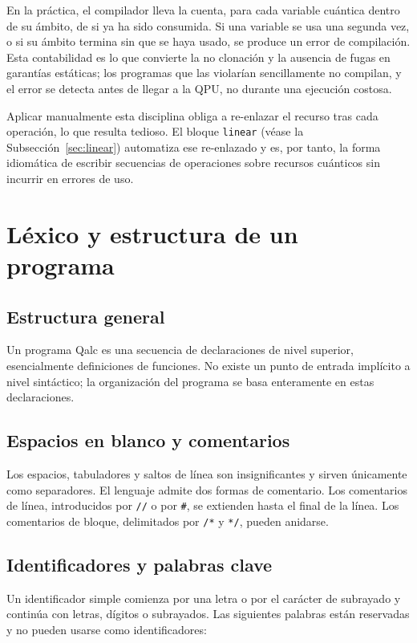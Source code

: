En la práctica, el compilador lleva la cuenta, para cada variable cuántica dentro de su ámbito, de si ya ha sido consumida. Si una variable se usa una segunda vez, o si su ámbito termina sin que se haya usado, se produce un error de compilación. Esta contabilidad es lo que convierte la no clonación y la ausencia de fugas en garantías estáticas; los programas que las violarían sencillamente no compilan, y el error se detecta antes de llegar a la QPU, no durante una ejecución costosa.

Aplicar manualmente esta disciplina obliga a re-enlazar el recurso tras cada operación, lo que resulta tedioso. El bloque \lstinline|linear| (véase la Subsección~\ref{sec:linear}) automatiza ese re-enlazado y es, por tanto, la forma idiomática de escribir secuencias de operaciones sobre recursos cuánticos sin incurrir en errores de uso.

\section{Léxico y estructura de un programa}

\subsection{Estructura general}

Un programa Qalc es una secuencia de declaraciones de nivel superior, esencialmente definiciones de funciones. No existe un punto de entrada implícito a nivel sintáctico; la organización del programa se basa enteramente en estas declaraciones.

\subsection{Espacios en blanco y comentarios}

Los espacios, tabuladores y saltos de línea son insignificantes y sirven únicamente como separadores. El lenguaje admite dos formas de comentario. Los comentarios de línea, introducidos por \lstinline|//| o por \lstinline|#|, se extienden hasta el final de la línea. Los comentarios de bloque, delimitados por \lstinline|/*| y \lstinline|*/|, pueden anidarse.

\subsection{Identificadores y palabras clave}

Un identificador simple comienza por una letra o por el carácter de subrayado y continúa con letras, dígitos o subrayados. Las siguientes palabras están reservadas y no pueden usarse como identificadores:

